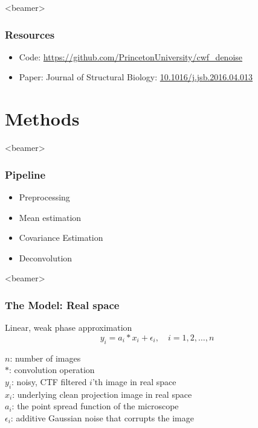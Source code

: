 \documentclass{beamer}
\begin{document}
\begin{frame}<beamer>
\frametitle{Resources}
\begin{itemize}
 \item Code: \url{https://github.com/PrincetonUniversity/cwf_denoise}
 \item Paper: Journal of Structural Biology: \url{10.1016/j.jsb.2016.04.013}
\end{itemize}
\end{frame}


\section{Methods}
\begin{frame}<beamer>
\frametitle{Pipeline}
\begin{itemize}
 \item Preprocessing
 \item Mean estimation
 \item Covariance Estimation
 \item Deconvolution
 
\end{itemize}


\end{frame}

\begin{frame}<beamer>
\frametitle{The Model: Real space}
Linear, weak phase approximation\\

\begin{equation}
 y_i = a_i \ast x_i + \epsilon_i, \quad i=1,2,\ldots,n
\label{eqn:model}
\end{equation}

$n$: number of images\\
$\ast$: convolution operation\\
$y_i$: noisy, CTF filtered $i$'th image in real space\\
$x_i$: underlying clean projection image in real space\\
$a_{i}$: the point spread function of the microscope\\
$\epsilon_i$: additive Gaussian noise that corrupts the image
\end{frame}
\end{document}
